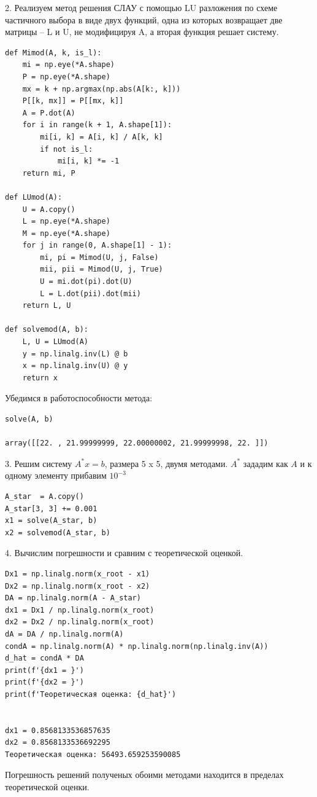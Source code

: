 2. Реализуем метод решения СЛАУ с помощью LU разложения по схеме частичного выбора в виде двух функций, одна из которых возвращает две матрицы – L и U, не модифицируя A, а вторая функция решает систему.
\begin{verbatim}
def Mimod(A, k, is_l):
    mi = np.eye(*A.shape)
    P = np.eye(*A.shape)
    mx = k + np.argmax(np.abs(A[k:, k]))
    P[[k, mx]] = P[[mx, k]]
    A = P.dot(A)
    for i in range(k + 1, A.shape[1]):
        mi[i, k] = A[i, k] / A[k, k]
        if not is_l:
            mi[i, k] *= -1
    return mi, P

def LUmod(A):
    U = A.copy()
    L = np.eye(*A.shape)
    M = np.eye(*A.shape)
    for j in range(0, A.shape[1] - 1):
        mi, pi = Mimod(U, j, False)
        mii, pii = Mimod(U, j, True)
        U = mi.dot(pi).dot(U)
        L = L.dot(pii).dot(mii)
    return L, U

def solvemod(A, b):
    L, U = LUmod(A)
    y = np.linalg.inv(L) @ b
    x = np.linalg.inv(U) @ y
    return x
\end{verbatim}

Убедимся в работоспособности метода:
\begin{verbatim}
solve(A, b)

array([[22. , 21.99999999, 22.00000002, 21.99999998, 22. ]])
\end{verbatim}

3. Решим систему  $A^*x = b$, размера 5 x 5, двумя методами. $A^*$ зададим как $A$ и к одному элементу прибавим $10^{-3}$  
\begin{verbatim}
A_star  = A.copy()
A_star[3, 3] += 0.001
x1 = solve(A_star, b)
x2 = solvemod(A_star, b)
\end{verbatim}

4. Вычислим погрешности и сравним с теоретической оценкой.
\begin{verbatim}
Dx1 = np.linalg.norm(x_root - x1)
Dx2 = np.linalg.norm(x_root - x2)
DA = np.linalg.norm(A - A_star)
dx1 = Dx1 / np.linalg.norm(x_root)
dx2 = Dx2 / np.linalg.norm(x_root)
dA = DA / np.linalg.norm(A)
condA = np.linalg.norm(A) * np.linalg.norm(np.linalg.inv(A))
d_hat = condA * DA
print(f'{dx1 = }')
print(f'{dx2 = }')
print(f'Теоретическая оценка: {d_hat}')


dx1 = 0.8568133536857635
dx2 = 0.8568133536692295
Теоретическая оценка: 56493.659253590085
\end{verbatim}

Погрешность решений полученых обоими методами находится в пределах теоретической оценки.

